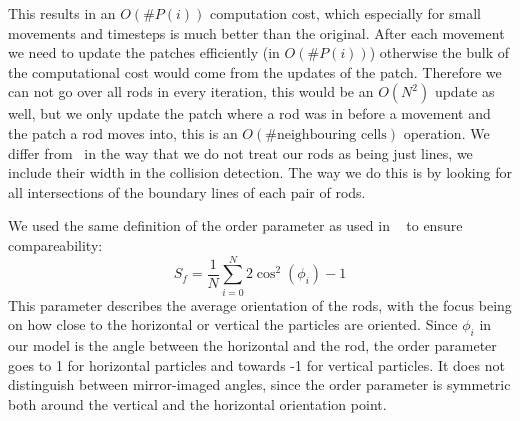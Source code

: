 This results in an $O(\#P(i))$ computation cost, which especially for small movements and timesteps is much better than the original. After each movement we need to update the patches efficiently (in $O(\#P(i))$) otherwise the bulk of the computational cost would come from the updates of the patch. Therefore we can not go over all rods in every iteration, this would be an $O(N^2)$ update as well, but we only update the patch where a rod was in before a movement and the patch a rod moves into, this is an $O(\#\text{neighbouring cells})$ operation. 
We differ from~\cite{SED} in the way that we do not treat our rods as being just lines, we include their width in the collision detection. The way we do this is by looking for all intersections of the boundary lines of each pair of rods.

We used the same definition of the order parameter as used in ~\cite{SED} to ensure compareability:
$$S_f= \frac{1}{N} \sum_{i=0}^N 2\cos^2(\phi_i)-1$$
This parameter describes the average orientation of the rods, with the focus being on how close to the horizontal or vertical the particles are oriented. Since $\phi_i$ in our model is the angle between the horizontal and the rod, the order parameter goes to 1 for horizontal particles and towards -1 for vertical particles. It does not distinguish between mirror-imaged angles, since the order parameter is symmetric both around the vertical and the horizontal orientation point. 
